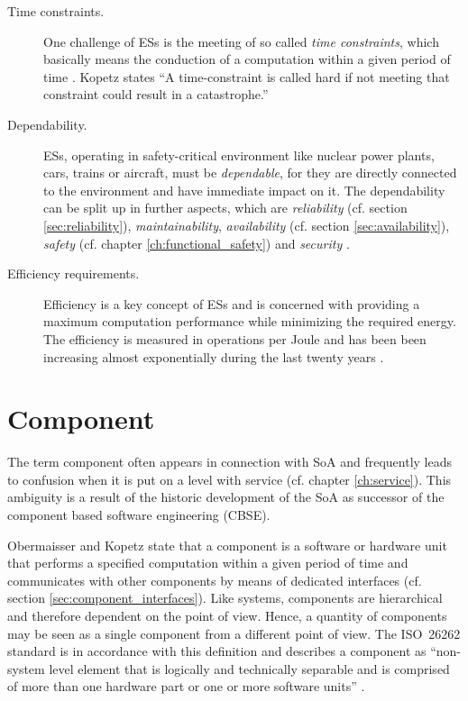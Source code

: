 \begin{description}
	\item [Time constraints.]
	One challenge of ESs is the meeting of so called \emph{time constraints}, which basically means the conduction of a computation within a given period of time \cite[p.8-9]{marwedel} \cite{rodrigues2011}. Kopetz \cite{kopetz} states ``A time-constraint is called hard if not meeting that constraint could result in a catastrophe.''
	\item [Dependability.]
	ESs, operating in safety-critical environment like nuclear power plants, cars, trains or aircraft, must be \emph{dependable}, for they are directly connected to the environment and have immediate impact on it. The dependability can be split up in further aspects, which are \emph{reliability} (cf. section \ref{sec:reliability}), \emph{maintainability}, \emph{availability} (cf. section \ref{sec:availability}), \emph{safety} (cf. chapter \ref{ch:functional_safety}) and \emph{security} \cite[p.4-5]{marwedel}.
	\item [Efficiency requirements.]
	Efficiency is a key concept of ESs and is concerned with providing a maximum computation performance while minimizing the required energy. The efficiency is measured in operations per Joule and has been been increasing almost exponentially during the last twenty years \cite{marwedel}.
\end{description}






\section{Component}
\label{ch:component}

The term component often appears in connection with SoA and frequently leads to confusion when it is put on a level with service (cf. chapter \ref{ch:service}). This ambiguity is a result of the historic development of the SoA as successor of the component based software engineering (CBSE).

Obermaisser and Kopetz state that a component is a software or hardware unit that performs a specified computation within a given period of time \cite[p.38]{genesys} and communicates with other components by means of dedicated interfaces (cf. section \ref{sec:component_interfaces}). Like systems, components are hierarchical and therefore dependent on the point of view. Hence, a quantity of components may be seen as a single component from a different point of view. The \mbox{ISO 26262} standard is in accordance with this definition and describes a component as ``non-system level element that is logically and technically separable and is comprised of more than one hardware part or one or more software units'' \cite{iso26262:1}.

